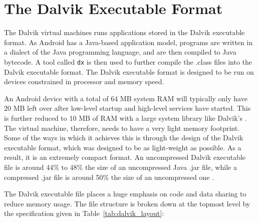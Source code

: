 \section{The Dalvik Executable Format}
\label{sec:dex}

The Dalvik virtual machines runs applications stored in the Dalvik executable format. As Android has a Java-based application model, programs are written in a dialect of the Java programming language, and are then compiled to Java bytecode. A tool called \verb|dx| is then used to further compile the .class files into the Dalvik executable format. The Dalvik executable format is designed to be run on devices constrained in processor and memory speed.

An Android device with a total of 64 MB system RAM will typically only have 20 MB left over after low-level startup and high-level services have started. This is further reduced to 10 MB of RAM with a large system library like Dalvik's \cite{dalvik_int}. The virtual machine, therefore, needs to have a very light memory footprint. Some of the ways in which it achieves this is through the design of the Dalvik executable format, which was designed to be as light-weight as possible. As a result, it is an extremely compact format. An uncompressed Dalvik executable file is around 44\% to 48\% the size of an uncompressed Java .jar file, while a compressed .jar file is around 50\% the size of an uncompressed one \cite{dalvik_int}.

The Dalvik executable file places a huge emphasis on code and data sharing to reduce memory usage. The file structure is broken down at the topmost level by the specification given in Table~\ref{tab:dalvik_layout}:

